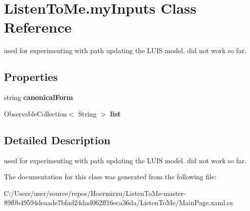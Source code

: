 \hypertarget{class_listen_to_me_1_1my_inputs}{}\section{Listen\+To\+Me.\+my\+Inputs Class Reference}
\label{class_listen_to_me_1_1my_inputs}


used for experimenting with path updating the L\+U\+IS model. did not work so far.  


\subsection*{Properties}
\begin{DoxyCompactItemize}
\item 
string {\bfseries canonical\+Form}\hypertarget{class_listen_to_me_1_1my_inputs_a6e63baf613d06d2fe0c196e3214c7b47}{}\label{class_listen_to_me_1_1my_inputs_a6e63baf613d06d2fe0c196e3214c7b47}

\item 
Observable\+Collection$<$ String $>$ {\bfseries list}\hypertarget{class_listen_to_me_1_1my_inputs_afa576673bde85df5836d17fb36f2d949}{}\label{class_listen_to_me_1_1my_inputs_afa576673bde85df5836d17fb36f2d949}

\end{DoxyCompactItemize}


\subsection{Detailed Description}
used for experimenting with path updating the L\+U\+IS model. did not work so far. 



The documentation for this class was generated from the following file\+:\begin{DoxyCompactItemize}
\item 
C\+:/\+Users/user/source/repos/\+Hoermirzu/\+Listen\+To\+Me-\/master-\/89f0b49594deaade7bfad24dad062ff16eca36da/\+Listen\+To\+Me/Main\+Page.\+xaml.\+cs\end{DoxyCompactItemize}
